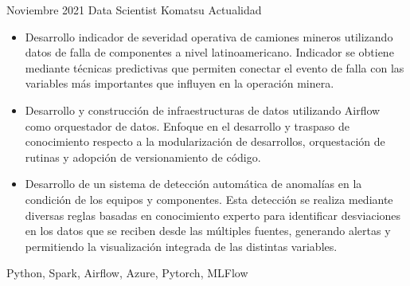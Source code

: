 \begin{experiences}

    \experience
        {Noviembre 2021}
        {Data Scientist}
        {Komatsu}
        {Actualidad}
        {
            \begin{itemize}
            \item Desarrollo indicador de severidad operativa de camiones mineros utilizando datos de falla de componentes a nivel latinoamericano.
            Indicador se obtiene mediante técnicas predictivas que permiten conectar el evento de falla con las variables más importantes que influyen en la operación minera.
            \item Desarrollo y construcción de infraestructuras de datos utilizando Airflow como orquestador de datos.
            Enfoque en el desarrollo y traspaso de conocimiento respecto a la modularización de desarrollos, orquestación de rutinas y adopción de versionamiento de código.
            \item Desarrollo de un sistema de detección automática de anomalías en la condición de los equipos y componentes.
            Esta detección se realiza mediante diversas reglas basadas en conocimiento experto para identificar desviaciones en los datos que se reciben desde las múltiples fuentes, generando alertas y permitiendo la visualización integrada de las distintas variables.
            \end{itemize}
        }
        {
            Python,
            Spark,
            Airflow,
            Azure,
            Pytorch,
            MLFlow
        }


\end{experiences}

